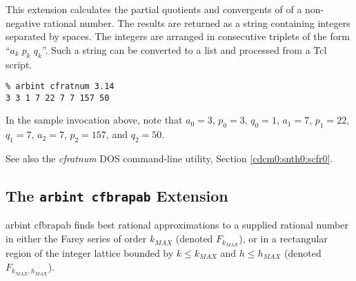 \begin{tclcommandsynopsis}
\end{tclcommandsynopsis}

\begin{tclcommanddescription}
This extension calculates the partial quotients and convergents of 
of a non-negative rational number.  The results are
returned as a string containing integers separated by spaces.
The integers are arranged in consecutive triplets of the form
``$a_k \; p_k \; q_k$''.  Such a string can be converted to a
list and processed from a Tcl script.
\end{tclcommanddescription}

\begin{tclcommandsampleinvocations}
\begin{scriptsize}
\begin{verbatim}
% arbint cfratnum 3.14
3 3 1 7 22 7 7 157 50
\end{verbatim}
\end{scriptsize}

In the sample invocation above, note that $a_0 = 3$,
$p_0 = 3$, $q_0 = 1$, $a_1 = 7$, $p_1 = 22$, $q_1 = 7$,
$a_2 = 7$, $p_2 = 157$, and $q_2 = 50$.  
\end{tclcommandsampleinvocations}

\begin{tclcommandseealso}
See also the \emph{cfratnum} DOS command-line utility, 
Section \cdcmzeroxrefhyphen{}\ref{cdcm0:snth0:scfr0}.
\end{tclcommandseealso}

\subsection{The \texttt{arbint cfbrapab} Extension}
\label{cxtn0:snth0:sbra0}

\begin{tclcommandname}{arbint cfbrapab}%
finds best rational approximations to a supplied rational
number in either the Farey series of order $k_{MAX}$ (denoted
$F_{k_{MAX}}$), or in a rectangular region of the integer lattice
bounded by $k \leq k_{MAX}$ and $h \leq h_{MAX}$
(denoted $F_{k_{MAX}, \overline{h_{MAX}}}$).
\end{tclcommandname}

